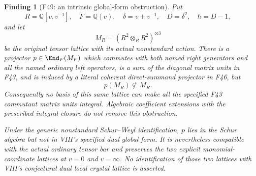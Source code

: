 \documentclass[11pt,a4paper]{article}
\newcommand{\Q}{\mathbb Q}\newcommand{\Z}{\mathbb Z}\newcommand{\C}{\mathbb C}\newcommand{\N}{\mathbb N}\newcommand{\F}{\mathbb F}
\newcommand{\fid}[1]{\textsf{#1}}\newcommand{\gate}[1]{\textsf{#1}}
\theoremstyle{named}\newtheorem{finding}{Finding}[section]
\theoremstyle{definition}\newtheorem{definition}[finding]{Definition}
\theoremstyle{remark}\newtheorem{remark}[finding]{Remark}
\begin{document}
\begin{finding}[\fid{F49}: an intrinsic global-form obstruction]\label{f:globallattice}
Put
\[
 R=\Q[v,v^{-1}],\quad F=\Q(v),\quad
 \delta=v+v^{-1},\quad D=\delta^2,\quad h=D-1,
\]
and let
\[
 M_R=(R^2\otimes_R R^2)^{\otimes3}
\]
be the original tensor lattice with its actual nonstandard action.
There is a projector $p\in\End_F(M_F)$ which commutes with both
named right generators and all the named ordinary left operators,
is a sum of the diagonal matrix units in \fid{F43}, and is induced
by a literal coherent direct-summand projector in \fid{F46}, but
\[
 p(M_R)\not\subseteq M_R.
\]
Consequently no basis of this same lattice can make all the specified
\fid{F43} commutant matrix units integral. Algebraic coefficient
extensions with the prescribed integral closure do not remove this
obstruction.

Under the generic nonstandard Schur--Weyl identification, $p$ lies
in the Schur algebra but not in VIII's specified dual global form.
It is nevertheless compatible with the actual ordinary tensor bar
and preserves the two explicit monomial-coordinate lattices at
$v=0$ and $v=\infty$. No identification of those two lattices with
VIII's conjectural dual local crystal lattice is asserted.
\end{finding}
\end{document}
